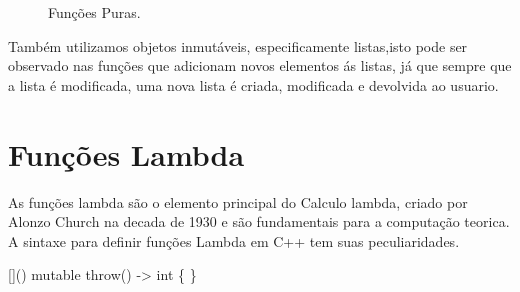 \documentclass[rel_mlp]{iiufrgs}
\newcommand{\fonte}[1]{\\Fonte: {#1}}
\begin{document}
\begin{figure}[htb]
    \centering
    \label{fig:figura1}
    \caption{Funções Puras.}
\end{figure}
Também utilizamos objetos inmutáveis, especificamente listas,isto pode ser observado nas funções que adicionam novos elementos ás listas, já que sempre que a lista é modificada, uma nova lista é criada, modificada e devolvida ao usuario.

 \section{Funções Lambda}

	As funções lambda são o elemento principal do Calculo lambda, criado por Alonzo Church na decada de 1930  e são fundamentais para a computação teorica. A sintaxe para definir funções  Lambda em C++ tem suas peculiaridades.
	
	[]() mutable throw() -> int \{ \}
\end{document}
